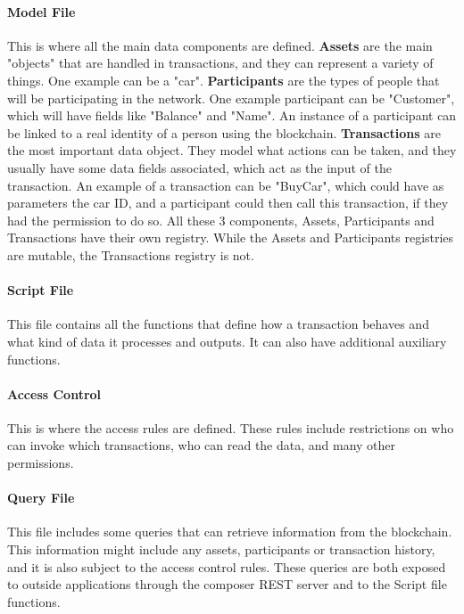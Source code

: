 \paragraph{Model File} This is where all the main data components are defined. \textbf{Assets} are the main "objects" that are handled in transactions, and they can represent a variety of things. One example can be a "car". \textbf{Participants} are the types of people that will be participating in the network. One example participant can be "Customer", which will have fields like "Balance" and "Name". An instance of a participant can be linked to a real identity of a person using the blockchain. \textbf{Transactions} are the most important data object. They model what actions can be taken, and they usually have some data fields associated, which act as the input of the transaction. An example of a transaction can be "BuyCar", which could have as parameters the car ID, and a participant could then call this transaction, if they had the permission to do so. All these 3 components, Assets, Participants and Transactions have their own registry. While the Assets and Participants registries are mutable, the Transactions registry is not.

\paragraph{Script File} This file contains all the functions that define how a transaction behaves and what kind of data it processes and outputs. It can also have additional auxiliary functions.

\paragraph{Access Control} This is where the access rules are defined. These rules include restrictions on who can invoke which transactions, who can read the data, and many other permissions.

\paragraph{Query File} This file includes some queries that can retrieve information from the blockchain. This information might include any assets, participants or transaction history, and it is also subject to the access control rules. These queries are both exposed to outside applications through the composer REST server and to the Script file functions.

